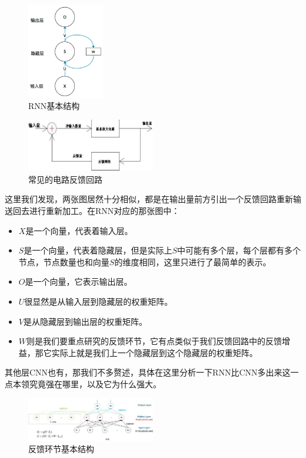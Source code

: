 \documentclass[11pt,a4paper]{elegantpaper}
\begin{document}
\begin{multicols}{2}
\begin{figure}[H]
  \centering
  \includegraphics[width=0.3\textwidth]{images/RNN.png}
  \caption{RNN基本结构} 
\end{figure}

\begin{figure}[H]
  \centering
  \includegraphics[width=0.5\textwidth]{images/FK.png}
  \caption{常见的电路反馈回路} 
\end{figure}

这里我们发现，两张图居然十分相似，都是在输出量前方引出一个反馈回路重新输送回去进行重新加工。在RNN对应的那张图中：

\begin{itemize}
  \item $X$是一个向量，代表着输入层。
  \item $S$是一个向量，代表着隐藏层，但是实际上$S$中可能有多个层，每个层都有多个节点，节点数量也和向量$S$的维度相同，这里只进行了最简单的表示。
  \item $O$是一个向量，它表示输出层。
  \item $U$很显然是从输入层到隐藏层的权重矩阵。
  \item $V$是从隐藏层到输出层的权重矩阵。
  \item $W$则是我们要重点研究的反馈环节，它有点类似于我们反馈回路中的反馈增益，那它实际上就是我们上一个隐藏层到这个隐藏层的权重矩阵。
\end{itemize}

其他层CNN也有，那我们不多赘述，具体在这里分析一下RNN比CNN多出来这一点本领究竟强在哪里，以及它为什么强大。

\begin{figure}[H]
  \centering
  \includegraphics[width=0.5\textwidth]{images/FFKK.png}
  \caption{反馈环节基本结构} 
\end{figure}


\end{multicols}
\end{document}
